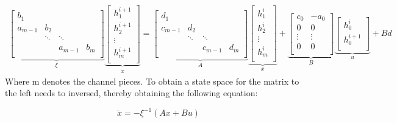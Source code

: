 \begin{equation}
\begin{aligned}
	   \underbrace{\begin{bmatrix}
	    	b_1 &        	&           &   \\
	    	a_{m-1} & b_2  		&     		&   \\
	    	  &	\ddots  & \ddots   \\
	          &  		&  		   a_{m-1}&  b_m\\
	   \end{bmatrix}}_{\xi}
	    \underbrace{\begin{bmatrix}
		h_{1}^{i+1} \\
		h_{2}^{i+1}\\
		\vdots		\\
		h_{m}^{i+1}\\
	\end{bmatrix}}_{\dot{x}}
	= 
	\underbrace{\begin{bmatrix}
	    	d_1 &  \\
	    	c_{m-1} & d_2 & \\
	    	  &	\ddots  & \ddots   \\
	    	  &   &  c_{m-1} &  d_m\\
	    \end{bmatrix}}_{A}
	    	\underbrace{\begin{bmatrix}
		h_{1}^{i} \\
		h_{2}^{i}\\
		\vdots		\\
		h_{m}^{i}\\
		\end{bmatrix}}_{x}
	+ \underbrace{\begin{bmatrix}
		c_0 & -a_0\\
		0 & 0 \\
		\vdots  & \vdots \\
		0 & 0\\
		\end{bmatrix}}_{B}
		\underbrace{\begin{bmatrix}
		h_{0}^{i} \\
		h_{0}^{i+1} \\
		\end{bmatrix}}_{u}
		+ Bd
	\end{aligned}
\end{equation}
Where m denotes the channel pieces.  
To obtain a state space for the matrix to the left needs to inversed, thereby obtaining the following equation:

\begin{equation}
	\dot{x} = -\xi^{-1} (Ax+Bu)
\end{equation}



